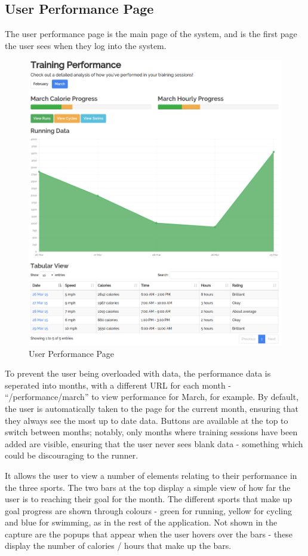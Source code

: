 \documentclass{article}[12pt,a4paper]
\begin{document}
\subsection{User Performance Page}
The user performance page is the main page of the system, and is the first page the user sees when they log into the system.

\begin{figure}[h!]
  \includegraphics[scale=0.35]{final_ui/user_performance}
  \caption{User Performance Page}
\end{figure}
\clearpage

To prevent the user being overloaded with data, the performance data is seperated into months, with a different URL for each month - ``/performance/march'' to view performance for March, for example. By default, the user is automatically taken to the page for the current month, ensuring that they always see the most up to date data. Buttons are available at the top to switch between months; notably, only months where training sessions have been added are visible, ensuring that the user never sees blank data - something which could be discouraging to the runner.

It allows the user to view a number of elements relating to their performance in the three sports. The two bars at the top display a simple view of how far the user is to reaching their goal for the month. The different sports that make up goal progress are shown through colours - green for running, yellow for cycling and blue for swimming, as in the rest of the application. Not shown in the capture are the popups that appear when the user hovers over the bars - these display the number of calories / hours that make up the bars. 
\end{document}
